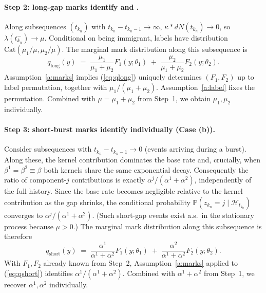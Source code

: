 \documentclass[11pt]{article}
\theoremstyle{remark}
\newcommand{\PP}{\mathbb{P}}
\begin{document}
\paragraph{Step 2: long-gap marks identify  and .}
Along subsequences $(t_{k_n})$ with $t_{k_n} - t_{k_n-1} \to \infty$, $\kappa \ast dN(t_{k_n}) \to 0$, so $\lambda(t_{k_n}^-) \to \mu$. Conditional on being immigrant, labels have distribution $\mathrm{Cat}(\mu_1/\mu, \mu_2/\mu)$. The marginal mark distribution along this subsequence is
\begin{equation}
q_{\mathrm{long}}(y) \;=\; \frac{\mu_1}{\mu_1+\mu_2} F_1(y; \theta_1) \;+\; \frac{\mu_2}{\mu_1+\mu_2} F_2(y; \theta_2). \label{eq:qlong}
\end{equation}
Assumption~\ref{a:marks} implies (\ref{eq:qlong}) uniquely determines $(F_1, F_2)$ up to label permutation, together with $\mu_1/(\mu_1+\mu_2)$. Assumption~\ref{a:label} fixes the permutation. Combined with $\mu = \mu_1+\mu_2$ from Step~1, we obtain $\mu_1, \mu_2$ individually.

\paragraph{Step 3: short-burst marks identify  individually (Case (b)).}
Consider subsequences with $t_{k_n} - t_{k_n-1} \to 0$ (events arriving during a burst). Along these, the kernel contribution dominates the base rate and, crucially, when $\beta^1 = \beta^2 \equiv \beta$ both kernels share the same exponential decay. Consequently the ratio of component-$j$ contributions is exactly $\alpha^j/(\alpha^1+\alpha^2)$, independently of the full history. Since the base rate becomes negligible relative to the kernel contribution as the gap shrinks, the conditional probability $\PP(z_{k_n} = j \mid \mathcal{H}_{t_{k_n}})$ converges to $\alpha^j/(\alpha^1+\alpha^2)$. (Such short-gap events exist a.s.\ in the stationary process because $\mu > 0$.) The marginal mark distribution along this subsequence is therefore
\begin{equation}
q_{\mathrm{short}}(y) \;=\; \frac{\alpha^1}{\alpha^1+\alpha^2} F_1(y; \theta_1) \;+\; \frac{\alpha^2}{\alpha^1+\alpha^2} F_2(y; \theta_2). \label{eq:qshort}
\end{equation}
With $F_1, F_2$ already known from Step~2, Assumption~\ref{a:marks} applied to (\ref{eq:qshort}) identifies $\alpha^1/(\alpha^1+\alpha^2)$. Combined with $\alpha^1+\alpha^2$ from Step~1, we recover $\alpha^1, \alpha^2$ individually.
\end{document}
